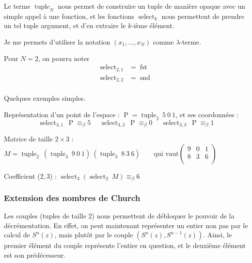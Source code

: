 \documentclass[11pt]{article}
\begin{document}
Le terme $\operatorname{tuple}_N$ nous permet de construire un tuple de manière opaque avec un simple appel à une fonction, et les fonctions $\operatorname{select}_k$ nous permettent de prendre un tel tuple argument, et d'en extraire le $k$-ième élément.

Je me permets d'utiliser la notation $(x_1, \dots, x_N)$ comme $\lambda$-terme.

\begin{remark}
    Pour $N =2$, on pourra noter
    \begin{equation*}
    \begin{aligned}
        \operatorname{select}_{2,1}&=\operatorname{fst}\\
        \operatorname{select}_{2,2}&=\operatorname{snd}\\
    \end{aligned}
    \end{equation*}
\end{remark}

\begin{example}
    Quelques exemples simples. 

    Représentation d'un point de l'espace : $\operatorname{P}=\operatorname{tuple}_2~5~0~1$, et ses coordonnées :
    $$\operatorname{select}_{3,1}~\operatorname{P}\equiv_\beta 5~~~~~~\operatorname{select}_{3,2}~\operatorname{P}\equiv_\beta 0~~~~~~\operatorname{select}_{3,3}~\operatorname{P}\equiv_\beta 1$$

    Matrice de taille $2\times 3$ : $M = \operatorname{tuple}_2~\left(\operatorname{tuple}_3~9~0~1\right)~\left(\operatorname{tuple}_3~8~3~6\right)~~~~~~~~~\text{qui vaut} \displaystyle\left(\begin{matrix}
        9 & 0 & 1\\
        8 & 3 & 6\\
    \end{matrix}\right)$

    Coefficient ($2, 3$) : $\operatorname{select}_3 \left(\operatorname{select}_2~M\right) \equiv_\beta 6$
\end{example}

\subsubsection{Extension des nombres de Church}

Les couples (tuples de taille 2) nous permettent de débloquer le pouvoir de la décrémentation. En effet, on peut maintenant représenter un entier non pas par le calcul de $S^{n}(z)$, mais plutôt par le couple $\left(S^{n}(z), S^{n-1}(z)\right)$. Ainsi, le premier élément du couple représente l'entier en question, et le deuxième élément est son prédécesseur.
\end{document}
